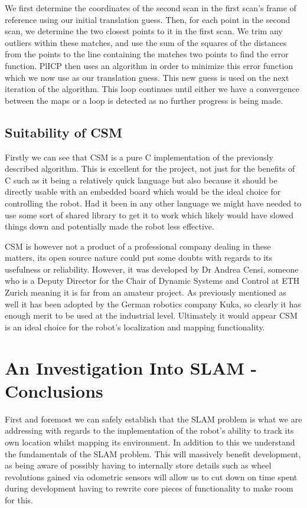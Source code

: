 					We first determine the coordinates of the second scan in the first scan's frame of reference using our initial translation guess. Then, for each point in the second scan, we determine the two closest points to it in the first scan. We trim any outliers within these matches, and use the sum of the squares of the distances from the points to the line containing the matches two points to find the error function. PlICP then uses an algorithm in order to minimize this error function which we now use as our translation guess. This new guess is used on the next iteration of the algorithm. This loop continues until either we have a convergence between the maps or a loop is detected as no further progress is being made.	
					
			\subsection{Suitability of CSM}
			Firstly we can see that CSM is a pure C implementation of the previously described algorithm. This is excellent for the project, not just for the benefits of C such as it being a relatively quick language but also because it should be directly usable with an embedded board which would be the ideal choice for controlling the robot. Had it been in any other language we might have needed to use some sort of shared library to get it to work which likely would have slowed things down and potentially made the robot less effective. 
			
			CSM is however not a product of a professional company dealing in these matters, its open source nature could put some doubts with regards to its usefulness or reliability. However, it was developed by Dr Andrea Censi, someone who is a Deputy Director for the Chair of Dynamic Systems and Control at ETH Zurich meaning it is far from an amateur project. As previously mentioned as well it has been adopted by the German robotics company Kuka, so clearly it has enough merit to be used at the industrial level. Ultimately it would appear CSM is an ideal choice for the robot's localization and mapping functionality.
					
			\section{An Investigation Into SLAM - Conclusions}	
			First and foremost we can safely establish that the SLAM problem is what we are addressing with regards to the implementation of the robot's ability to track its own location whilst mapping its environment. In addition to this we understand the fundamentals of the SLAM problem. This will massively benefit development, as being aware of possibly having to internally store details such as wheel revolutions gained via odometric sensors will allow us to cut down on time spent during development having to rewrite core pieces of functionality to make room for this. 

